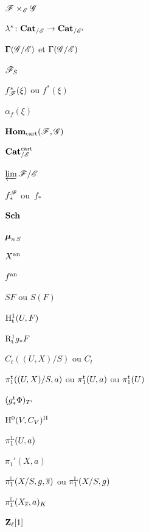 \begin{theindex}
\medskip\item $\cal {F}\times_{\cal {E}}\cal {G}$\dotfill\pageref{indnot:fk}
\medskip\item $\lambda^*\colon \Cat_{/\cal {E}}\to \Cat_{/\cal {E}'}$\dotfill\pageref{indnot:fl}
\medskip\item $\bf {\Gamma }(\cal {G}/\cal {E})$ et $\Gamma (\cal {G}/\cal {E})$\dotfill\pageref{indnot:fm}
\medskip\item $\cal {F}_S$\dotfill\pageref{indnot:fn}
\medskip\item $f^*_{\cal {F}}(\xi )$ ou $f^*(\xi )$\dotfill\pageref{indnot:fo}
\medskip\item $\alpha_f(\xi )$\dotfill\pageref{indnot:fp}
\medskip\item $\SheafHom_\cart (\cal {F},\cal {G})$\dotfill\pageref{indnot:fq}
\medskip\item $\Cat^\cart_{/\cal {E}}$\dotfill\pageref{indnot:fr}
\medskip\item $\varprojLim \cal {F}/\cal {E}$\dotfill\pageref{indnot:fs}
\medskip\item $f_*^{\cal {F}}$ ou~$f_*$\dotfill\pageref{indnot:ft}
\medskip\item $\mathbf{Sch} $\dotfill\pageref{indnot:hb}
\medskip\item $\boldsymbol{\mu}_{n\,S}$\dotfill\pageref{indnot:kb}
\medskip\item $X^{\mathrm{an}} $\dotfill\pageref{indnot:lb}
\medskip\item $f^{\mathrm{an}} $\dotfill\pageref{indnot:lc}
\medskip\item $SF$ ou $S(F)$\dotfill\pageref{indnot:mb}
\medskip\item $\mathrm{H}^1_{\mathrm{t}}(U,F)$\dotfill\pageref{indnot:mc}
\medskip\item $\mathrm{R}^1_{\mathrm{t}} g_* F$\dotfill\pageref{indnot:md}
\medskip\item $C_t((U,X)/S)$ ou $C_t$\dotfill\pageref{indnot:me}
\medskip\item $\pi_1^{\mathrm{t}}((U,X)/S,a)$ ou $\pi_1^{\mathrm{t}}(U,a)$ ou $\pi_1^{\mathrm{t}}(U)$\dotfill\pageref{indnot:mf}
\medskip\item $(g_*^{\mathrm{t}}\Phi )_{T'}$\dotfill\pageref{indnot:mg}
\medskip\item $\mathrm{H}^0(V,C_V)^{\Pi }$\dotfill\pageref{indnot:mh}
\medskip\item $\pi_1^{\mathbb{L} }(U,a)$\dotfill\pageref{indnot:mi}
\medskip\item $\pi_1'(X,a)$\dotfill\pageref{indnot:mj}
\medskip\item $\pi_1^{\mathbb{L}} (X/S,g,\overline {s})$ ou $\pi_1^{\mathbb{L}} (X/S,g)$\dotfill\pageref{indnot:mk}
\medskip\item $\pi_1^{\mathbb{L}} (X_{\overline {s}},a)_K$\dotfill\pageref{indnot:ml}
\medskip\item $\mathbf{Z}_\ell [1]$\dotfill\pageref{indnot:mm}
\par
\end{theindex}



